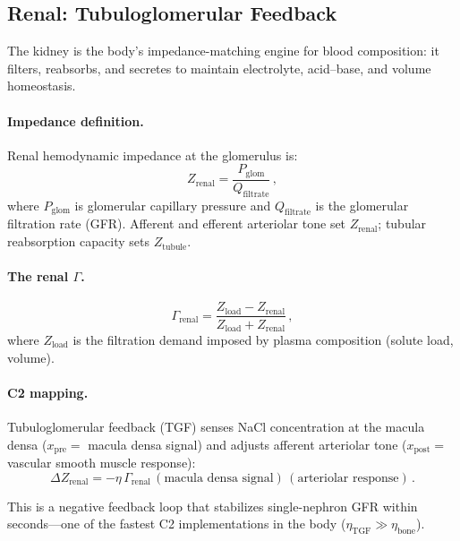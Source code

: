 \documentclass[aps,pre,twocolumn,superscriptaddress,floatfix]{revtex4-2}
\begin{document}
\subsection{Renal: Tubuloglomerular Feedback}
\label{sec:renal}

The kidney is the body's impedance-matching engine for
blood composition: it filters, reabsorbs, and secretes
to maintain electrolyte, acid--base, and volume homeostasis.

\paragraph{Impedance definition.}
Renal hemodynamic impedance at the glomerulus is:
\begin{equation}
  Z_{\text{renal}} =
  \frac{P_{\text{glom}}}{Q_{\text{filtrate}}}\,,
  \label{eq:z-renal}
\end{equation}
where $P_{\text{glom}}$ is glomerular capillary pressure
and $Q_{\text{filtrate}}$ is the glomerular filtration
rate (GFR).  Afferent and efferent arteriolar tone
set $Z_{\text{renal}}$; tubular reabsorption capacity
sets $Z_{\text{tubule}}$.

\paragraph{The renal $\Gamma$.}
\begin{equation}
  \Gamma_{\text{renal}} =
  \frac{Z_{\text{load}} - Z_{\text{renal}}}
       {Z_{\text{load}} + Z_{\text{renal}}}\,,
  \label{eq:gamma-renal}
\end{equation}
where $Z_{\text{load}}$ is the filtration demand
imposed by plasma composition (solute load, volume).

\paragraph{C2 mapping.}
Tubuloglomerular feedback (TGF) senses NaCl
concentration at the macula densa
($x_{\text{pre}} = $ macula densa signal) and
adjusts afferent arteriolar tone
($x_{\text{post}} = $ vascular smooth muscle
response):
\begin{equation}
  \Delta Z_{\text{renal}} =
  -\eta\,\Gamma_{\text{renal}}\,
  (\text{macula densa signal})\,
  (\text{arteriolar response})\,.
  \label{eq:c2-renal}
\end{equation}

This is a negative feedback loop that stabilizes
single-nephron GFR within seconds---one of the fastest
C2 implementations in the body
($\eta_{\text{TGF}} \gg \eta_{\text{bone}}$).
\end{document}
